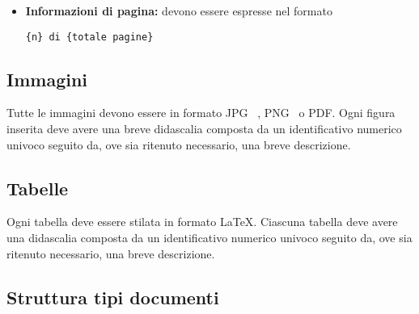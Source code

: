 {{\begin{itemize}
\begin{itemize}
				\begin{center}
					\textit{Proponente} o \textit{\Zucchetti}
				\end{center}
				\item \textbf{Nome del committente:} deve essere identificato nel seguente stile:
				\begin{center}
				\textit{Committente} o \textit{\Vardanega} e \textit{\Cardin}
				\end{center}
				\item \textbf{Nome del progetto:} deve essere identificato nel seguente stile:
				\begin{center}
					\textbf{\mytalk}
				\end{center}
			\end{itemize}
			\item \textbf{Informazioni di pagina:} devono essere espresse nel formato
			\begin{center}
				\texttt{\{n\} di \{totale pagine\} }
			\end{center}
		\end{itemize}
	}

	\subsection{Immagini}{
		  Tutte le immagini devono essere in formato JPG\g~ , PNG\g~ o PDF\g .
		  Ogni figura inserita deve avere una breve didascalia composta da un identificativo numerico univoco seguito da, ove sia ritenuto necessario, una breve descrizione.
	}
	
	\subsection{Tabelle}{
		Ogni tabella deve essere stilata in formato \LaTeX . Ciascuna tabella deve avere una didascalia composta da un identificativo numerico univoco seguito da, ove sia ritenuto necessario, una breve descrizione.
	}
	
	\subsection{Struttura tipi documenti} {
}}
